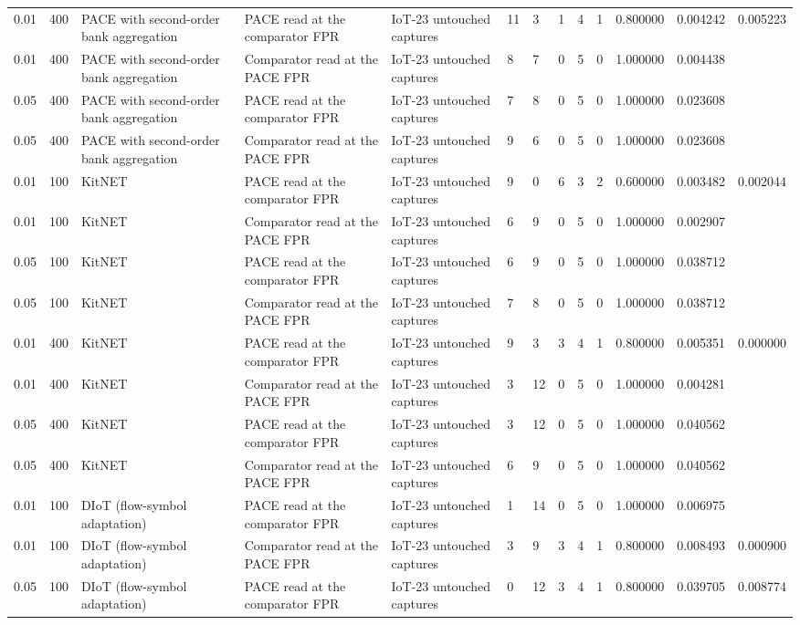 \begin{tabular}{lllllllllllll}
0.01 & 400 & PACE with second-order bank aggregation & PACE read at the comparator FPR & IoT-23 untouched captures & 11 & 3 & 1 & 4 & 1 & 0.800000 & 0.004242 & 0.005223 \\
0.01 & 400 & PACE with second-order bank aggregation & Comparator read at the PACE FPR & IoT-23 untouched captures & 8 & 7 & 0 & 5 & 0 & 1.000000 & 0.004438 &  \\
0.05 & 400 & PACE with second-order bank aggregation & PACE read at the comparator FPR & IoT-23 untouched captures & 7 & 8 & 0 & 5 & 0 & 1.000000 & 0.023608 &  \\
0.05 & 400 & PACE with second-order bank aggregation & Comparator read at the PACE FPR & IoT-23 untouched captures & 9 & 6 & 0 & 5 & 0 & 1.000000 & 0.023608 &  \\
0.01 & 100 & KitNET & PACE read at the comparator FPR & IoT-23 untouched captures & 9 & 0 & 6 & 3 & 2 & 0.600000 & 0.003482 & 0.002044 \\
0.01 & 100 & KitNET & Comparator read at the PACE FPR & IoT-23 untouched captures & 6 & 9 & 0 & 5 & 0 & 1.000000 & 0.002907 &  \\
0.05 & 100 & KitNET & PACE read at the comparator FPR & IoT-23 untouched captures & 6 & 9 & 0 & 5 & 0 & 1.000000 & 0.038712 &  \\
0.05 & 100 & KitNET & Comparator read at the PACE FPR & IoT-23 untouched captures & 7 & 8 & 0 & 5 & 0 & 1.000000 & 0.038712 &  \\
0.01 & 400 & KitNET & PACE read at the comparator FPR & IoT-23 untouched captures & 9 & 3 & 3 & 4 & 1 & 0.800000 & 0.005351 & 0.000000 \\
0.01 & 400 & KitNET & Comparator read at the PACE FPR & IoT-23 untouched captures & 3 & 12 & 0 & 5 & 0 & 1.000000 & 0.004281 &  \\
0.05 & 400 & KitNET & PACE read at the comparator FPR & IoT-23 untouched captures & 3 & 12 & 0 & 5 & 0 & 1.000000 & 0.040562 &  \\
0.05 & 400 & KitNET & Comparator read at the PACE FPR & IoT-23 untouched captures & 6 & 9 & 0 & 5 & 0 & 1.000000 & 0.040562 &  \\
0.01 & 100 & DIoT (flow-symbol adaptation) & PACE read at the comparator FPR & IoT-23 untouched captures & 1 & 14 & 0 & 5 & 0 & 1.000000 & 0.006975 &  \\
0.01 & 100 & DIoT (flow-symbol adaptation) & Comparator read at the PACE FPR & IoT-23 untouched captures & 3 & 9 & 3 & 4 & 1 & 0.800000 & 0.008493 & 0.000900 \\
0.05 & 100 & DIoT (flow-symbol adaptation) & PACE read at the comparator FPR & IoT-23 untouched captures & 0 & 12 & 3 & 4 & 1 & 0.800000 & 0.039705 & 0.008774 \\

\end{tabular}
